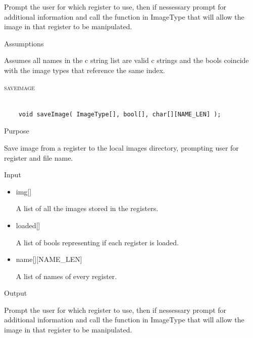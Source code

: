\documentclass[pdftex, 11pt]{article}
\begin{document}
\begin{description}
\begin{description}
				Prompt the user for which register to use, then if nessessary
				prompt for additional information and call the function
				in ImageType that will allow the image in that register to
				be manipulated.

			\item{Assumptions}

				Assumes all names in the c string list are valid c
				strings and the bools coincide with the image types that
				reference the same index.

		\end{description}



	\item{\textsc{saveimage}}

		\begin{lstlisting}

	void saveImage( ImageType[], bool[], char[][NAME_LEN] );
		\end{lstlisting}

		\begin{description}
			\item{Purpose}

				Save image from a register to the local images directory, prompting user for
				register and file name.

			\item{Input}

				\begin{itemize}

					\item{img[]}

						A list of all the images stored in the registers.

					\item{loaded[]}

						A list of bools representing if each register is loaded.

					\item{name[][NAME\_LEN]}

						A list of names of every register.

				\end{itemize}

			\item{Output}

				Prompt the user for which register to use, then if nessessary
				prompt for additional information and call the function
				in ImageType that will allow the image in that register to
				be manipulated.


\end{description}
\end{description}
\end{document}
